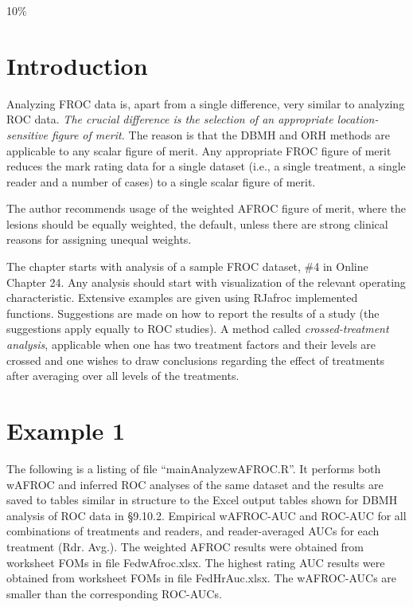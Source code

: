 \documentclass[
]{book}
\begin{document}
10\%

\hypertarget{analyzing-froc-data-intro}{%
\section{Introduction}\label{analyzing-froc-data-intro}}

Analyzing FROC data is, apart from a single difference, very similar to analyzing ROC data. \emph{The crucial difference is the selection of an appropriate location-sensitive figure of merit.} The reason is that the DBMH and ORH methods are applicable to any scalar figure of merit. Any appropriate FROC figure of merit reduces the mark rating data for a single dataset (i.e., a single treatment, a single reader and a number of cases) to a single scalar figure of merit.

The author recommends usage of the weighted AFROC figure of merit, where the lesions should be equally weighted, the default, unless there are strong clinical reasons for assigning unequal weights.

The chapter starts with analysis of a sample FROC dataset, \#4 in Online Chapter 24. Any analysis should start with visualization of the relevant operating characteristic. Extensive examples are given using RJafroc implemented functions. Suggestions are made on how to report the results of a study (the suggestions apply equally to ROC studies). A method called \emph{crossed-treatment analysis}, applicable when one has two treatment factors and their levels are crossed and one wishes to draw conclusions regarding the effect of treatments after averaging over all levels of the treatments.

\hypertarget{analyzing-froc-data-example1}{%
\section{Example 1}\label{analyzing-froc-data-example1}}

The following is a listing of file ``mainAnalyzewAFROC.R''. It performs both wAFROC and inferred ROC analyses of the same dataset and the results are saved to tables similar in structure to the Excel output tables shown for DBMH analysis of ROC data in §9.10.2.
Empirical wAFROC-AUC and ROC-AUC for all combinations of treatments and readers, and reader-averaged AUCs for each treatment (Rdr. Avg.). The weighted AFROC results were obtained from worksheet FOMs in file FedwAfroc.xlsx. The highest rating AUC results were obtained from worksheet FOMs in file FedHrAuc.xlsx. The wAFROC-AUCs are smaller than the corresponding ROC-AUCs.
\end{document}
